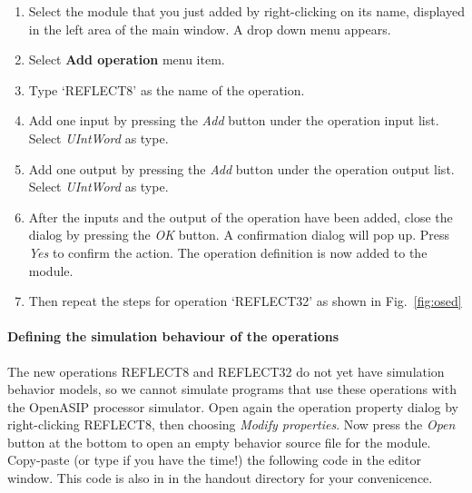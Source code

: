 \documentclass[a4paper,twoside]{tceusermanual}
\begin{document}
\begin{enumerate}
\item%
  Select the module that you just added by right-clicking on its name,
  displayed in the left area of the main window. A drop down menu appears.
\item%
  Select \textbf{Add operation} menu item.
\item%
  Type `REFLECT8' as the name of the operation.
\item%
  Add one input by pressing the \emph{Add} button under the operation input
  list. Select \textit{UIntWord} as type.
\item%
  Add one output by pressing the \emph{Add} button under the operation output
  list. Select \textit{UIntWord} as type.
\item%
  After the inputs and the output of the operation have been added, close
  the dialog by pressing the \emph{OK} button. A confirmation dialog will pop
  up. Press \emph{Yes} to confirm the action. The operation definition is
  now added to the module.
\item%
  Then repeat the steps for operation `REFLECT32' as shown in Fig.~\ref{fig:osed}
\end{enumerate}

\paragraph{Defining the simulation behaviour of the operations} The new operations
REFLECT8 and REFLECT32 do not yet have simulation behavior models, so
we cannot simulate programs that use these operations with the OpenASIP
processor simulator. Open again the operation property dialog by
right-clicking REFLECT8, then choosing \emph{Modify properties}. Now
press the \emph{Open} button at the bottom to open an empty behavior
source file for the module. Copy-paste (or type if you have the time!) 
the following code in the editor window. This code is also in 
in the handout directory for your convenicence.
\end{document}
